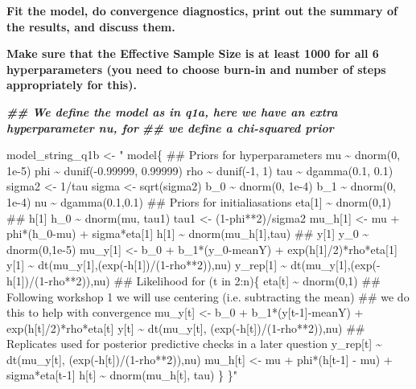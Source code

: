 \documentclass[
]{article}
\newenvironment{Shaded}{\begin{snugshade}}{\end{snugshade}}
\newcommand{\DocumentationTok}[1]{\textcolor[rgb]{0.56,0.35,0.01}{\textbf{\textit{#1}}}}
\newcommand{\NormalTok}[1]{#1}
\newcommand{\OtherTok}[1]{\textcolor[rgb]{0.56,0.35,0.01}{#1}}
\newcommand{\StringTok}[1]{\textcolor[rgb]{0.31,0.60,0.02}{#1}}
\begin{document}
\textbf{Fit the model, do convergence diagnostics, print out the summary
of the results, and discuss them.}

\textbf{Make sure that the Effective Sample Size is at least 1000 for
all 6 hyperparameters (you need to choose burn-in and number of steps
appropriately for this).}

\begin{Shaded}
\begin{Highlighting}[]
\DocumentationTok{\#\# We define the model as in q1a, here we have an extra hyperparameter nu, for }
\DocumentationTok{\#\# we define a chi{-}squared prior}

\NormalTok{model\_string\_q1b }\OtherTok{\textless{}{-}} \StringTok{" model\{}
\StringTok{  }
\StringTok{  \#\# Priors for hyperparameters}
\StringTok{  }
\StringTok{  mu \textasciitilde{} dnorm(0, 1e{-}5)}
\StringTok{  phi \textasciitilde{} dunif({-}0.99999, 0.99999)}
\StringTok{  rho \textasciitilde{} dunif({-}1, 1)}
\StringTok{  }
\StringTok{  tau \textasciitilde{} dgamma(0.1, 0.1)}
\StringTok{  sigma2 \textless{}{-} 1/tau}
\StringTok{  sigma \textless{}{-} sqrt(sigma2)}
\StringTok{  }
\StringTok{  b\_0 \textasciitilde{} dnorm(0, 1e{-}4)}
\StringTok{  b\_1 \textasciitilde{} dnorm(0, 1e{-}4)}
\StringTok{  }
\StringTok{  nu \textasciitilde{} dgamma(0.1,0.1)}
\StringTok{  }
\StringTok{  \#\# Priors for initialiasations}
\StringTok{  }
\StringTok{  eta[1] \textasciitilde{} dnorm(0,1)}
\StringTok{  }
\StringTok{  \#\# h[1]}
\StringTok{  h\_0 \textasciitilde{} dnorm(mu, tau1)}
\StringTok{  tau1 \textless{}{-} (1{-}phi**2)/sigma2}
\StringTok{  mu\_h[1] \textless{}{-} mu + phi*(h\_0{-}mu) + sigma*eta[1]}
\StringTok{  h[1] \textasciitilde{} dnorm(mu\_h[1],tau)}
\StringTok{  }
\StringTok{  \#\# y[1]}
\StringTok{  y\_0 \textasciitilde{} dnorm(0,1e{-}5)}
\StringTok{  mu\_y[1] \textless{}{-} b\_0 + b\_1*(y\_0{-}meanY) + exp(h[1]/2)*rho*eta[1]}
\StringTok{  y[1] \textasciitilde{} dt(mu\_y[1],(exp({-}h[1])/(1{-}rho**2)),nu)}
\StringTok{  y\_rep[1] \textasciitilde{} dt(mu\_y[1],(exp({-}h[1])/(1{-}rho**2)),nu)}
\StringTok{  }
\StringTok{  \#\# Likelihood}
\StringTok{  }
\StringTok{  for (t in 2:n)\{}
\StringTok{  }
\StringTok{    eta[t] \textasciitilde{} dnorm(0,1)}
\StringTok{    }
\StringTok{    \#\# Following workshop 1 we will use centering (i.e. subtracting the mean)}
\StringTok{    \#\# we do this to help with convergence }
\StringTok{    }
\StringTok{    mu\_y[t] \textless{}{-} b\_0 + b\_1*(y[t{-}1]{-}meanY) + exp(h[t]/2)*rho*eta[t]}
\StringTok{    }
\StringTok{    y[t] \textasciitilde{} dt(mu\_y[t], (exp({-}h[t])/(1{-}rho**2)),nu)}
\StringTok{    }
\StringTok{    \#\# Replicates used for posterior predictive checks in a later question}
\StringTok{    y\_rep[t]  \textasciitilde{} dt(mu\_y[t], (exp({-}h[t])/(1{-}rho**2)),nu)}
\StringTok{    }
\StringTok{    mu\_h[t] \textless{}{-} mu + phi*(h[t{-}1] {-} mu) + sigma*eta[t{-}1]}
\StringTok{    h[t] \textasciitilde{} dnorm(mu\_h[t], tau)}
\StringTok{  \}}
\StringTok{  }
\StringTok{  }
\StringTok{  }
\StringTok{\}"}
\end{Highlighting}
\end{Shaded}
\end{document}
